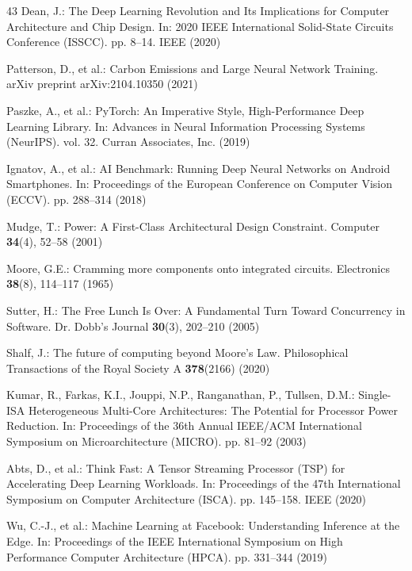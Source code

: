 \documentclass[conference]{IEEEtran}
\begin{document}
\begin{thebibliography}{43}
Dean, J.: The Deep Learning Revolution and Its Implications for Computer Architecture and Chip Design. In: 2020 IEEE International Solid-State Circuits Conference (ISSCC). pp. 8--14. IEEE (2020)

Patterson, D., et al.: Carbon Emissions and Large Neural Network Training. arXiv preprint arXiv:2104.10350 (2021)

Paszke, A., et al.: PyTorch: An Imperative Style, High-Performance Deep Learning Library. In: Advances in Neural Information Processing Systems (NeurIPS). vol. 32. Curran Associates, Inc. (2019)

Ignatov, A., et al.: AI Benchmark: Running Deep Neural Networks on Android Smartphones. In: Proceedings of the European Conference on Computer Vision (ECCV). pp. 288--314 (2018)

Mudge, T.: Power: A First-Class Architectural Design Constraint. Computer \textbf{34}(4), 52--58 (2001)

Moore, G.E.: Cramming more components onto integrated circuits. Electronics \textbf{38}(8), 114--117 (1965)

Sutter, H.: The Free Lunch Is Over: A Fundamental Turn Toward Concurrency in Software. Dr. Dobb's Journal \textbf{30}(3), 202--210 (2005)

Shalf, J.: The future of computing beyond Moore's Law. Philosophical Transactions of the Royal Society A \textbf{378}(2166) (2020)

Kumar, R., Farkas, K.I., Jouppi, N.P., Ranganathan, P., Tullsen, D.M.: Single-ISA Heterogeneous Multi-Core Architectures: The Potential for Processor Power Reduction. In: Proceedings of the 36th Annual IEEE/ACM International Symposium on Microarchitecture (MICRO). pp. 81--92 (2003)

Abts, D., et al.: Think Fast: A Tensor Streaming Processor (TSP) for Accelerating Deep Learning Workloads. In: Proceedings of the 47th International Symposium on Computer Architecture (ISCA). pp. 145--158. IEEE (2020)

Wu, C.-J., et al.: Machine Learning at Facebook: Understanding Inference at the Edge. In: Proceedings of the IEEE International Symposium on High Performance Computer Architecture (HPCA). pp. 331--344 (2019)


\end{thebibliography}
\end{document}
